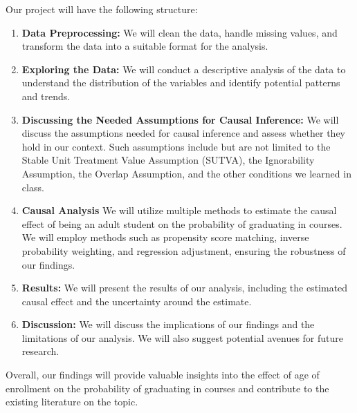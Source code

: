\documentclass[11pt]{article}
\begin{document}
Our project will have the following structure:
\begin{enumerate}
  \item \textbf{Data Preprocessing:} We will clean the data, handle missing values, and transform the data into a suitable format for the analysis.
  \item \textbf{Exploring the Data:} We will conduct a descriptive analysis of the data to understand the distribution of the variables and identify potential patterns and trends.
  \item \textbf{Discussing the Needed Assumptions for Causal Inference:} We will discuss the assumptions needed for causal inference and assess whether they hold in our context. Such assumptions include but are not limited to the Stable Unit Treatment Value Assumption (SUTVA), the Ignorability Assumption, the Overlap Assumption, and the other conditions we learned in class.
  \item \textbf{Causal Analysis} We will utilize multiple methods to estimate the causal effect of being an adult student on the probability of graduating in courses. We will employ methods such as propensity score matching, inverse probability weighting, and regression adjustment, ensuring the robustness of our findings.
  \item \textbf{Results:} We will present the results of our analysis, including the estimated causal effect and the uncertainty around the estimate.
  \item \textbf{Discussion:} We will discuss the implications of our findings and the limitations of our analysis. We will also suggest potential avenues for future research.
\end{enumerate}

Overall, our findings will provide valuable insights into the effect of age of enrollment on the probability of graduating in courses and contribute to the existing literature on the topic.
\end{document}
